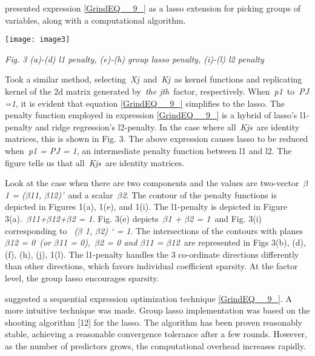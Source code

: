 \documentclass{article} %
\begin{document}
\noindent [11] presented expression \eqref{GrindEQ__9_} as a lasso extension for picking groups of variables, along with a computational algorithm.

\noindent \texttt{[image: image3]}

\noindent \textit{Fig. 3 (a)-(d) l1 penalty, (e)-(h) group lasso penalty, (i)-(l) l2 penalty}

\noindent 

\noindent [17] Took a similar method, selecting~\textit{Xj}~and~\textit{Kj}~as kernel functions and replicating kernel of the 2d matrix generated by~\textit{the jth}~factor, respectively. When~\textit{p1}~to~\textit{PJ =1}, it is evident that equation \eqref{GrindEQ__9_} simplifies to the lasso. The penalty function employed in expression \eqref{GrindEQ__9_} is a hybrid of lasso's l1-penalty and ridge regression's l2-penalty. In the case where all~\textit{Kjs}~are identity matrices, this is shown in Fig. 3. The above expression causes lasso to be reduced when~\textit{p1 = PJ = 1}, an intermediate penalty function between l1 and l2. The figure tells us that all~\textit{Kjs}~are identity matrices.

\noindent Look at the case when there are two components and the values are two-vector~\textit{$\beta$1 = ($\beta$11, $\beta$12)'}~and a scalar~\textit{$\beta$2}. The contour of the penalty functions is depicted in Figures 1(a), 1(e), and 1(i). The l1-penalty is depicted in Figure 3(a).~\textit{{\textbar}$\beta$11{\textbar}+{\textbar}$\beta$12{\textbar}+{\textbar}$\beta$2{\textbar} = 1}. Fig. 3(e) depicts~\textit{{\textbar}{\textbar}$\beta$1{\textbar}{\textbar} + {\textbar}$\beta$2{\textbar} = 1}~and Fig. 3(i) corresponding to~\textit{{\textbar}{\textbar} ($\beta$ 1, $\beta$2) `{\textbar}{\textbar} = 1}. The intersections of the contours with planes~\textit{$\beta$12 = 0}~\textit{(or $\beta$11 = 0),}~\textit{$\beta$2 = 0 and $\beta$11 = $\beta$12}~are represented in Figs 3(b), (d), (f), (h), (j), 1(l). The l1-penalty handles the 3 co-ordinate directions differently than other directions, which favors individual coefficient sparsity. At the factor level, the group lasso encourages sparsity.

\noindent [11] suggested a sequential expression optimization technique \eqref{GrindEQ__9_}. A more intuitive technique was made. Group lasso implementation was based on the shooting algorithm [12] for the lasso. The algorithm has been proven reasonably stable, achieving a reasonable convergence tolerance after a few rounds. However, as the number of predictors grows, the computational overhead increases rapidly.
\end{document}
